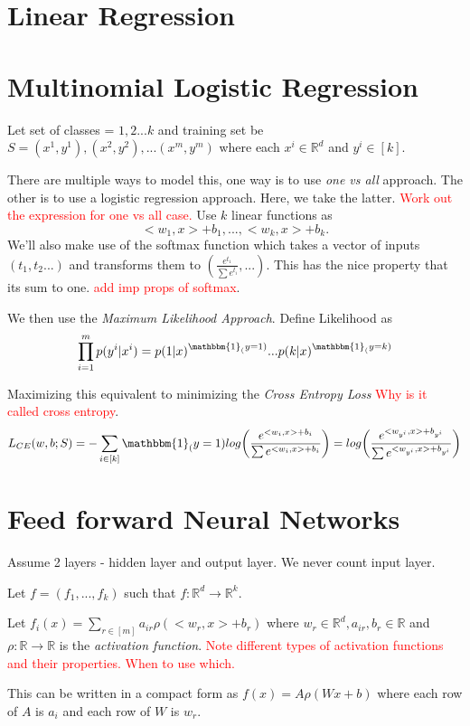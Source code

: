 \section{Linear Regression}


\section{Multinomial Logistic Regression}
Let set of classes = ${1,2...k}$ and training set be $S = {(x^1, y^1), (x^2, y^2), ... (x^m, y^m)}$ where each $x^i \in \mathbb{R}^d$ and $y^i \in [k]$. 

There are multiple ways to model this, one way is to use \textit{one vs all} approach. The other is to use a logistic regression approach. Here, we take the latter. \textcolor{red}{Work out the expression for one vs all case.} Use $k$ linear functions as 
\[
	<w_1,x> + b_1, ..., <w_k, x> + b_k.
\]
We'll also make use of the softmax function which takes a vector of inputs $(t_1, t_2...)$ and transforms them to $(\frac{e^{t_1}}{\sum e^{t_i}}, ... )$. This has the nice property that its sum to one. \textcolor{red}{add imp props of softmax}.

We then use the \textit{Maximum Likelihood Approach}. Define Likelihood as
\[
	\prod_{i=1}^{m}p(y^i|x^i) = p(1|x)^{\mathbbm{1}_(y=1)}...p(k|x)^{\mathbbm{1}_(y=k)}
\]

Maximizing this equivalent to minimizing the \textit{Cross Entropy Loss} \textcolor{red}{Why is it called cross entropy}.
\[
	L_{CE}(w,b;S) = -\sum_{i\in[k]}\mathbbm{1}_(y=1)log\bigg(\frac{e^{<w_i,x>+b_i}}{\sum e^{<w_i,x>+b_i}}\bigg) = log\bigg( \frac{e^{<w_{y^i},x>+b_{y^i}}}{\sum e^{<w_{y^i},x>+b_{y^i}}} \bigg)
\]

\section{Feed forward Neural Networks}
Assume 2 layers - hidden layer and output layer. We never count input layer. 

Let $f = (f_1, ..., f_k)$ such that $f:\mathbb{R}^d \to \mathbb{R}^k$.

Let $f_i(x) = \sum_{r\in[m]}a_{ir}\rho(<w_r,x> + b_r)$ where $w_r \in \mathbb{R}^d, a_{ir}, b_r \in \mathbb{R}$ and $\rho:\mathbb{R}\to\mathbb{R}$ is the \textit{activation function}. \textcolor{red}{Note different types of activation functions and their properties. When to use which.}

This can be written in a compact form as $f(x) = A\rho(Wx + b)$ where each row of $A$ is $a_i$ and each row of $W$ is $w_r$.


